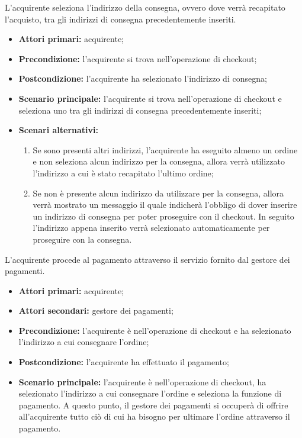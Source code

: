 L'acquirente seleziona l'indirizzo della consegna, ovvero dove verrà recapitato l'acquisto, tra gli indirizzi di consegna precedentemente inseriti.
\begin{itemize}
    \item \textbf{Attori primari:} acquirente;
    \item \textbf{Precondizione:} l'acquirente si trova nell'operazione di checkout;
    \item \textbf{Postcondizione:} l'acquirente ha selezionato l'indirizzo di consegna;
    \item \textbf{Scenario principale:} l'acquirente si trova nell'operazione di checkout e seleziona uno tra gli indirizzi di consegna precedentemente inseriti;
    \item \textbf{Scenari alternativi:}
    \begin{enumerate}[label=\lett]
        \item Se sono presenti altri indirizzi, l'acquirente ha eseguito almeno un ordine e non seleziona alcun indirizzo per la consegna, allora verrà utilizzato l'indirizzo a cui è stato recapitato l'ultimo ordine;
        \item Se non è presente alcun indirizzo da utilizzare per la consegna, allora verrà mostrato un messaggio il quale indicherà l'obbligo di dover inserire un indirizzo di consegna per poter proseguire con il checkout. In seguito l'indirizzo appena inserito verrà selezionato automaticamente per proseguire con la consegna.
    \end{enumerate}
\end{itemize}

L'acquirente procede al pagamento attraverso il servizio fornito dal gestore dei pagamenti.
\begin{itemize}
    \item \textbf{Attori primari:} acquirente;
    \item \textbf{Attori secondari:} gestore dei pagamenti;
    \item \textbf{Precondizione:} l'acquirente è nell'operazione di checkout e ha selezionato l'indirizzo a cui consegnare l'ordine;
    \item \textbf{Postcondizione:} l'acquirente ha effettuato il pagamento;
    \item \textbf{Scenario principale:} l'acquirente è nell'operazione di checkout, ha selezionato l'indirizzo a cui consegnare l'ordine e seleziona la funzione di pagamento. A questo punto, il gestore dei pagamenti si occuperà di offrire all'acquirente tutto ciò di cui ha bisogno per ultimare l'ordine attraverso il pagamento.
\end{itemize}

